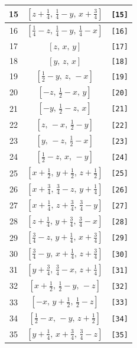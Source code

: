 \documentclass[fleqn,8pt]{jsarticle}
\begin{document}
\begin{longtable}{ccc}
15 & $\left[ z + \frac{1}{4},\, \frac{1}{4} - y,\, x + \frac{3}{4} \right]$ & {\tt [15]} \\ \hline
16 & $\left[ \frac{1}{4} - z,\, \frac{1}{4} - y,\, \frac{1}{4} - x \right]$ & {\tt [16]} \\ \hline
17 & $\left[ z,\, x,\, y \right]$ & {\tt [17]} \\ \hline
18 & $\left[ y,\, z,\, x \right]$ & {\tt [18]} \\ \hline
19 & $\left[ \frac{1}{2} - y,\, z,\, - x \right]$ & {\tt [19]} \\ \hline
20 & $\left[ - z,\, \frac{1}{2} - x,\, y \right]$ & {\tt [20]} \\ \hline
21 & $\left[ - y,\, \frac{1}{2} - z,\, x \right]$ & {\tt [21]} \\ \hline
22 & $\left[ z,\, - x,\, \frac{1}{2} - y \right]$ & {\tt [22]} \\ \hline
23 & $\left[ y,\, - z,\, \frac{1}{2} - x \right]$ & {\tt [23]} \\ \hline
24 & $\left[ \frac{1}{2} - z,\, x,\, - y \right]$ & {\tt [24]} \\ \hline
25 & $\left[ x + \frac{1}{2},\, y + \frac{1}{2},\, z + \frac{1}{2} \right]$ & {\tt [25]} \\ \hline
26 & $\left[ x + \frac{3}{4},\, \frac{3}{4} - z,\, y + \frac{1}{4} \right]$ & {\tt [26]} \\ \hline
27 & $\left[ x + \frac{1}{4},\, z + \frac{3}{4},\, \frac{3}{4} - y \right]$ & {\tt [27]} \\ \hline
28 & $\left[ z + \frac{1}{4},\, y + \frac{3}{4},\, \frac{3}{4} - x \right]$ & {\tt [28]} \\ \hline
29 & $\left[ \frac{3}{4} - z,\, y + \frac{1}{4},\, x + \frac{3}{4} \right]$ & {\tt [29]} \\ \hline
30 & $\left[ \frac{3}{4} - y,\, x + \frac{1}{4},\, z + \frac{3}{4} \right]$ & {\tt [30]} \\ \hline
31 & $\left[ y + \frac{3}{4},\, \frac{3}{4} - x,\, z + \frac{1}{4} \right]$ & {\tt [31]} \\ \hline
32 & $\left[ x + \frac{1}{2},\, \frac{1}{2} - y,\, - z \right]$ & {\tt [32]} \\ \hline
33 & $\left[ - x,\, y + \frac{1}{2},\, \frac{1}{2} - z \right]$ & {\tt [33]} \\ \hline
34 & $\left[ \frac{1}{2} - x,\, - y,\, z + \frac{1}{2} \right]$ & {\tt [34]} \\ \hline
35 & $\left[ y + \frac{1}{4},\, x + \frac{3}{4},\, \frac{3}{4} - z \right]$ & {\tt [35]} \\ \hline

\end{longtable}
\end{document}
